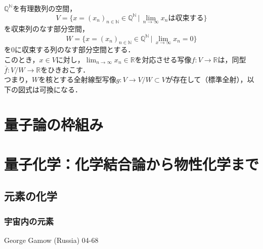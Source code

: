 \documentclass[uplatex, 12pt, dvipdfmx]{jsreport}
\begin{document}
\begin{theorem}[Cauchy列による実数体の構成]　\\
    $\mathbb{Q}^\mathbb{N}$を有理数列の空間，
    $$V=\{ x=(x_n)_{n\in\mathbb{N}} \in\mathbb{Q}^\mathbb{N} \,|\, \lim_{n\to\infty} x_nは収束する \}$$
    を収束列のなす部分空間，
    $$W=\{x=(x_n)_{n\in\mathbb{N}}\in\mathbb{Q}^\mathbb{N}\, |\, \lim_{x\to\infty} x_n=0\}$$
    を$0$に収束する列のなす部分空間とする．\\
    このとき，$x\in V$に対し，$\lim_{n\to\infty}x_n\in\mathbb{R}$を対応させる写像$f:V\longrightarrow \mathbb{R}$は，同型$\overline{f}:V/W\longrightarrow\mathbb{R}$をひきおこす．\\
    つまり，$W$を核とする全射線型写像$g:V\longrightarrow V/W\subset V$が存在して（標準全射），以下の図式は可換になる．
    \begin{center}
    \end{center}

\end{theorem}

\part{量子論の枠組み}

\part{量子化学：化学結合論から物性化学まで}

\chapter{元素の化学}
\section{宇宙内の元素}
George Gamow (Russia) 04-68
\end{document}
